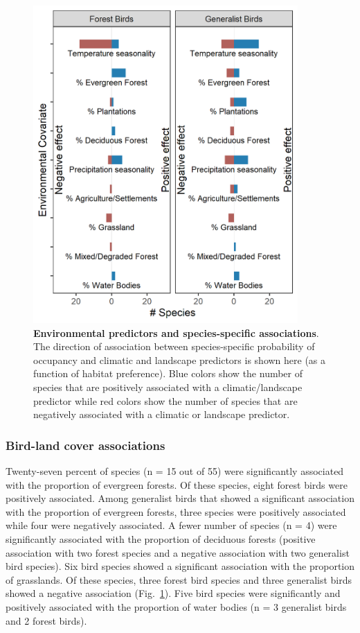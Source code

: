 \begin{figure}[h!]
    \centering
    \includegraphics[width=0.9\textwidth]{figures/hillybirds/fig_04.png}
    \caption{
        \textbf{Environmental predictors and species-specific associations}.
        The direction of association between species-specific probability of occupancy and climatic and landscape predictors is shown here (as a function of habitat preference). 
        Blue colors show the number of species that are positively associated with a climatic/landscape predictor while red colors show the number of species that are negatively associated with a climatic or landscape predictor.
    }
    \label{hilly_fig_04}
\end{figure}

\subsubsection*{Bird-land cover associations}

Twenty-seven percent of species (n = 15 out of 55) were significantly associated with the proportion of evergreen forests.
Of these species, eight forest birds were positively associated.
Among generalist birds that showed a significant association with the proportion of evergreen forests, three species were positively associated while four were negatively associated.
A fewer number of species (n = 4) were significantly associated with the proportion of deciduous forests (positive association with two forest species and a negative association with two generalist bird species).
Six bird species showed a significant association with the proportion of grasslands.
Of these species, three forest bird species and three generalist birds showed a negative association (Fig.~\ref{hilly_fig_04}).
Five bird species were significantly and positively associated with the proportion of water bodies (n = 3 generalist birds and 2 forest birds).

